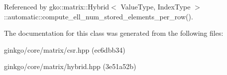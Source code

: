 Referenced by gko\+::matrix\+::\+Hybrid$<$ Value\+Type, Index\+Type $>$\+::automatic\+::compute\+\_\+ell\+\_\+num\+\_\+stored\+\_\+elements\+\_\+per\+\_\+row().



The documentation for this class was generated from the following files\+:\begin{DoxyCompactItemize}
\item 
ginkgo/core/matrix/csr.\+hpp (ec6dbb34)\item 
ginkgo/core/matrix/hybrid.\+hpp (3e51a52b)\end{DoxyCompactItemize}
